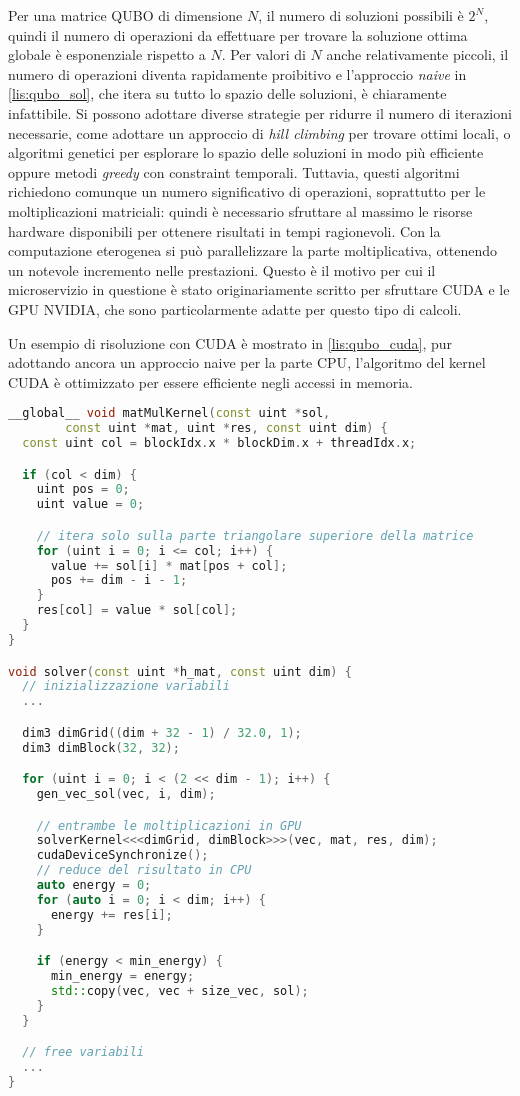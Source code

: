 Per una matrice \gls{QUBO} di dimensione $N$, il numero di soluzioni possibili è $2^N$, quindi il numero di operazioni da effettuare per trovare la soluzione ottima globale è esponenziale rispetto a $N$. Per valori di $N$ anche relativamente piccoli, il numero di operazioni diventa rapidamente proibitivo e l'approccio \textit{naive} in \ref{lis:qubo_sol}, che itera su tutto lo spazio delle soluzioni, è chiaramente infattibile.
Si possono adottare diverse strategie per ridurre il numero di iterazioni necessarie, come adottare un approccio di \textit{hill climbing} per trovare ottimi locali, o algoritmi genetici per esplorare lo spazio delle soluzioni in modo più efficiente oppure metodi \textit{greedy} con constraint temporali. Tuttavia, questi algoritmi richiedono comunque un numero significativo di operazioni, soprattutto per le moltiplicazioni matriciali: quindi è necessario sfruttare al massimo le risorse hardware disponibili per ottenere risultati in tempi ragionevoli. Con la computazione eterogenea si può parallelizzare la parte moltiplicativa, ottenendo un notevole incremento nelle prestazioni. Questo è il motivo per cui il microservizio in questione è stato originariamente scritto per sfruttare \gls{CUDA} e le \gls{GPU} NVIDIA, che sono particolarmente adatte per questo tipo di calcoli.

Un esempio di risoluzione con \gls{CUDA} è mostrato in \ref{lis:qubo_cuda}, pur adottando ancora un approccio naive per la parte \gls{CPU}, l'algoritmo del kernel \gls{CUDA} è ottimizzato per essere efficiente negli accessi in memoria.


\vspace{5mm}
\begin{lstlisting}[language=C++, caption=CUDA moltiplicazine matrice QUBO, label=lis:qubo_cuda]
__global__ void matMulKernel(const uint *sol,
        const uint *mat, uint *res, const uint dim) {
  const uint col = blockIdx.x * blockDim.x + threadIdx.x;

  if (col < dim) {
    uint pos = 0;
    uint value = 0;

    // itera solo sulla parte triangolare superiore della matrice
    for (uint i = 0; i <= col; i++) {
      value += sol[i] * mat[pos + col];
      pos += dim - i - 1;
    }
    res[col] = value * sol[col];
  }
}

void solver(const uint *h_mat, const uint dim) {
  // inizializzazione variabili
  ...

  dim3 dimGrid((dim + 32 - 1) / 32.0, 1);
  dim3 dimBlock(32, 32);

  for (uint i = 0; i < (2 << dim - 1); i++) {
    gen_vec_sol(vec, i, dim);

    // entrambe le moltiplicazioni in GPU
    solverKernel<<<dimGrid, dimBlock>>>(vec, mat, res, dim);
    cudaDeviceSynchronize();
    // reduce del risultato in CPU
    auto energy = 0;
    for (auto i = 0; i < dim; i++) {
      energy += res[i];
    }

    if (energy < min_energy) {
      min_energy = energy;
      std::copy(vec, vec + size_vec, sol);
    }
  }

  // free variabili
  ...
}
\end{lstlisting}
\vspace{5mm}

